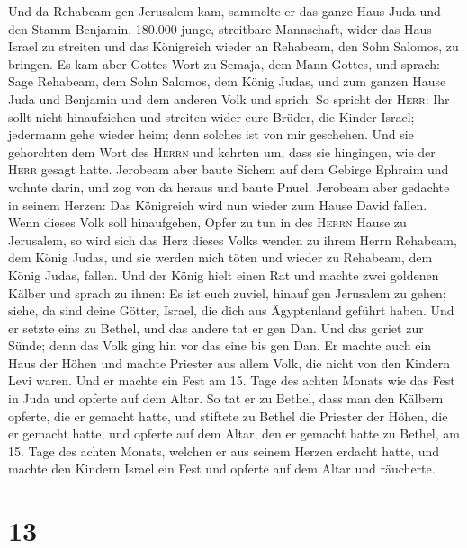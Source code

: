  Und da Rehabeam gen Jerusalem kam, sammelte er das ganze
Haus Juda und den Stamm Benjamin, 180.000 junge, streitbare Mannschaft,
wider das Haus Israel zu streiten und das Königreich wieder an Rehabeam,
den Sohn Salomos, zu bringen.  Es kam aber Gottes Wort zu
Semaja, dem Mann Gottes, und sprach:  Sage Rehabeam, dem
Sohn Salomos, dem König Judas, und zum ganzen Hause Juda und Benjamin
und dem anderen Volk und sprich:  So spricht der
\textsc{Herr}: Ihr sollt nicht hinaufziehen und streiten wider eure
Brüder, die Kinder Israel; jedermann gehe wieder heim; denn solches ist
von mir geschehen. Und sie gehorchten dem Wort des \textsc{Herrn} und
kehrten um, dass sie hingingen, wie der \textsc{Herr} gesagt hatte.
 Jerobeam aber baute Sichem auf dem Gebirge Ephraim und
wohnte darin, und zog von da heraus und baute Pnuel. 
Jerobeam aber gedachte in seinem Herzen: Das Königreich wird nun wieder
zum Hause David fallen.  Wenn dieses Volk soll
hinaufgehen, Opfer zu tun in des \textsc{Herrn} Hause zu Jerusalem, so
wird sich das Herz dieses Volks wenden zu ihrem Herrn Rehabeam, dem
König Judas, und sie werden mich töten und wieder zu Rehabeam, dem König
Judas, fallen.  Und der König hielt einen Rat und machte
zwei goldenen Kälber und sprach zu ihnen: Es ist euch zuviel, hinauf gen
Jerusalem zu gehen; siehe, da sind deine Götter, Israel, die dich aus
Ägyptenland geführt haben.  Und er setzte eins zu Bethel,
und das andere tat er gen Dan.  Und das geriet zur Sünde;
denn das Volk ging hin vor das eine bis gen Dan.  Er
machte auch ein Haus der Höhen und machte Priester aus allem Volk, die
nicht von den Kindern Levi waren.  Und er machte ein Fest
am 15. Tage des achten Monats wie das Fest in Juda und opferte auf dem
Altar. So tat er zu Bethel, dass man den Kälbern opferte, die er gemacht
hatte, und stiftete zu Bethel die Priester der Höhen, die er gemacht
hatte,  und opferte auf dem Altar, den er gemacht hatte
zu Bethel, am 15. Tage des achten Monats, welchen er aus seinem Herzen
erdacht hatte, und machte den Kindern Israel ein Fest und opferte auf
dem Altar und räucherte.

\hypertarget{section-12}{%
\section{13}\label{section-12}}

